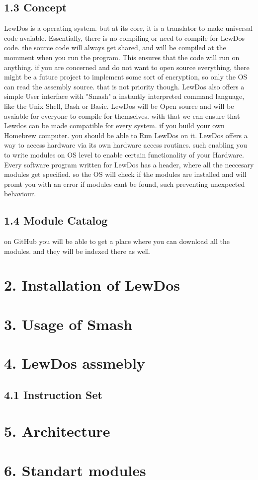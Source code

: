\documentclass[12pt, letterpaper]{article}
\begin{document}
\subsection*{1.3 Concept}
LewDos is a operating system. but at its core, it is a translator to make universal code avaiable. Essentially, there is no compiling or need to compile for LewDos code.
the source code will always get shared, and will be compiled at the momment when you run the program. This ensures that the code will run on anything. if you are concerned and do not want
to open source everything, there might be a future project to implement some sort of encryption, so only the OS can read the assembly source. that is not priority though.
LewDos also offers a simple User interface with "Smash" a instantly interpreted command language, like the Unix Shell, Bash or Basic. LewDos will be Open source and will be avaiable for 
everyone to compile for themselves. with that we can ensure that Lewdos can be made compatible for every system. if you build your own Homebrew computer. you should be able to Run LewDos on it.
LewDos offers a way to access hardware via its own hardware access routines. such enabling you to write modules on OS level to enable certain functionality of your Hardware.
Every software program written for LewDos has a header, where all the neccesary modules get specified. so the OS will check if the modules are installed and will promt you with an error
if modules cant be found, such preventing unexpected behaviour.
\subsection*{1.4 Module Catalog}
on GitHub you will be able to get a place where you can download all the modules. and they will be indexed there as well.
\newpage
\section*{2. Installation of LewDos}
\section*{3. Usage of Smash}
\section*{4. LewDos assmebly}
\subsection*{4.1 Instruction Set}
\section*{5. Architecture}
\section*{6. Standart modules} %
\end{document}
